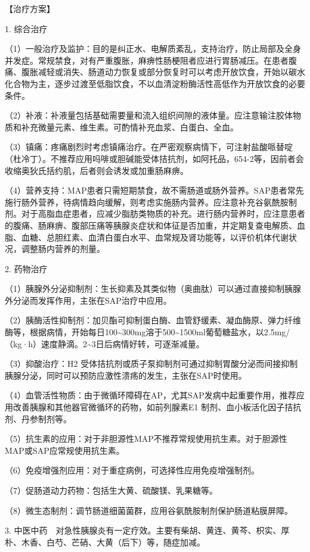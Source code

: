【治疗方案】

1. 综合治疗

（1）一般治疗及监护：目的是纠正水、电解质紊乱，支持治疗，防止局部及全身并发症。常规禁食，对有严重腹胀，麻痹性肠梗阻者应进行胃肠减压。在患者腹痛、腹胀减轻或消失、肠道动力恢复或部分恢复时可以考虑开放饮食，开始以碳水化合物为主，逐步过渡至低脂饮食，不以血清淀粉酶活性高低作为开放饮食的必要条件。

（2）补液：补液量包括基础需要量和流入组织间隙的液体量。应注意输注胶体物质和补充微量元素、维生素。可酌情补充血浆、白蛋白、全血。

（3）镇痛：疼痛剧烈时考虑镇痛治疗。在严密观察病情下，可注射盐酸哌替啶（杜冷丁）。不推荐应用吗啡或胆碱能受体拮抗剂，如阿托品，654-2等，因前者会收缩奥狄氏括约肌，后者则会诱发或加重肠麻痹。

（4）营养支持：MAP患者只需短期禁食，故不需肠道或肠外营养。SAP患者常先施行肠外营养，待病情趋向缓解，则考虑实施肠内营养。应注意补充谷氨酰胺制剂。对于高脂血症患者，应减少脂肪类物质的补充。进行肠内营养时，应注意患者的腹痛、肠麻痹、腹部压痛等胰腺炎症状和体征是否加重，并定期复查电解质、血脂、血糖、总胆红素、血清白蛋白水平、血常规及肾功能等，以评价机体代谢状况，调整肠内营养的剂量。

2. 药物治疗

（1）胰腺外分泌抑制剂：生长抑素及其类似物（奥曲肽）可以通过直接抑制胰腺外分泌而发挥作用，主张在SAP治疗中应用。

（2）胰酶活性抑制剂：加贝酯可抑制蛋白酶、血管舒缓素、凝血酶原、弹力纤维酶等，根据病情，开始每日100\textasciitilde{}300mg溶于500\textasciitilde{}1500ml葡萄糖盐水，以2.5mg/（kg·h）速度静滴。2\textasciitilde{}3日后病情好转，可逐渐减量。

（3）抑酸治疗：H{2}
受体拮抗剂或质子泵抑制剂可通过抑制胃酸分泌而间接抑制胰腺分泌，同时可以预防应激性溃疡的发生，主张在SAP时使用。

（4）血管活性物质：由于微循环障碍在AP，尤其SAP发病中起重要作用，推荐应用改善胰腺和其他器官微循环的药物，如前列腺素E{1}
制剂、血小板活化因子拮抗剂、丹参制剂等。

（5）抗生素的应用：对于非胆源性MAP不推荐常规使用抗生素。对于胆源性MAP或SAP应常规使用抗生素。

（6）免疫增强剂应用：对于重症病例，可选择性应用免疫增强制剂。

（7）促肠道动力药物：包括生大黄、硫酸镁、乳果糖等。

（8）微生态制剂：调节肠道细菌菌群，应用谷氨酰胺制剂保护肠道粘膜屏障。

3.
中医中药　对急性胰腺炎有一定疗效。主要有柴胡、黄连、黄芩、枳实、厚朴、木香、白芍、芒硝、大黄（后下）等，随症加减。

